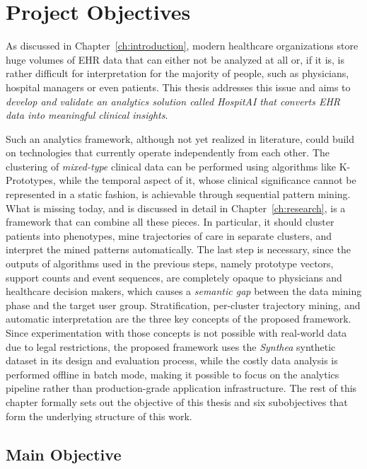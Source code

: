 \chapter{Project Objectives}\label{ch:objectives}

\pagestyle{fancy}

As discussed in Chapter~\ref{ch:introduction}, modern healthcare organizations store huge volumes of EHR data that can either not be analyzed at all or, if it is, is rather difficult for interpretation for the majority of people, such as physicians, hospital managers or even patients. This thesis addresses this issue and aims to \emph{develop and validate an analytics solution called HospitAI that converts EHR data into meaningful clinical insights}.

Such an analytics framework, although not yet realized in literature, could build on technologies that currently operate independently from each other. The clustering of \emph{mixed-type} clinical data can be performed using algorithms like K-Prototypes, while the temporal aspect of it, whose clinical significance cannot be represented in a static fashion, is achievable through sequential pattern mining. What is missing today, and is discussed in detail in Chapter~\ref{ch:research}, is a framework that can combine all these pieces. In particular, it should cluster patients into phenotypes, mine trajectories of care in separate clusters, and interpret the mined patterns automatically. The last step is necessary, since the outputs of algorithms used in the previous steps, namely prototype vectors, support counts and event sequences, are completely opaque to physicians and healthcare decision makers, which causes a \emph{semantic gap} between the data mining phase and the target user group. Stratification, per-cluster trajectory mining, and automatic interpretation are the three key concepts of the proposed framework. Since experimentation with those concepts is not possible with real-world data due to legal restrictions, the proposed framework uses the \emph{Synthea} synthetic dataset in its design and evaluation process, while the costly data analysis is performed offline in batch mode, making it possible to focus on the analytics pipeline rather than production-grade application infrastructure. The rest of this chapter formally sets out the objective of this thesis and six subobjectives that form the underlying structure of this work.

\section{Main Objective}

